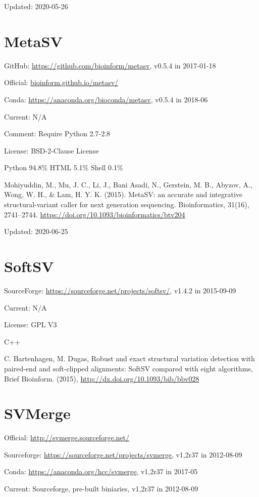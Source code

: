 \documentclass[]{article}
\begin{document}
Updated: 2020-05-26

\section{MetaSV}

GitHub: \url{https://github.com/bioinform/metasv}, v0.5.4 in 2017-01-18

Official: \url{bioinform.github.io/metasv/}

Conda: \url{https://anaconda.org/bioconda/metasv}, v0.5.4 in 2018-06

Current: N/A

Comment: Require Python 2.7-2.8

License: BSD-2-Clause License

Python 94.8\% HTML 5.1\% Shell 0.1\%

Mohiyuddin, M., Mu, J. C., Li, J., Bani Asadi, N., Gerstein, M. B., Abyzov, A., Wong, W. H., \& Lam, H. Y. K. (2015). MetaSV: an accurate and integrative structural-variant caller for next generation sequencing. Bioinformatics, 31(16), 2741–2744. \url{https://doi.org/10.1093/bioinformatics/btv204}

Updated: 2020-06-25

\section{SoftSV}

SourceForge: \url{https://sourceforge.net/projects/softsv/}, v1.4.2 in 2015-09-09

Current: N/A

License: GPL V3

C++

C. Bartenhagen, M. Dugas, Robust and exact structural variation detection with paired-end and soft-clipped alignments: SoftSV compared with eight algorithms, Brief Bioinform. (2015), \url{http://dx.doi.org/10.1093/bib/bbv028}

\section{SVMerge}

Official: \url{http://svmerge.sourceforge.net/}

Sourceforge: \url{https://sourceforge.net/projects/svmerge}, v1,2r37 in 2012-08-09

Conda: \url{https://anaconda.org/hcc/svmerge}, v1,2r37 in 2017-05

Current: Sourceforge, pre-built biniaries, v1,2r37 in 2012-08-09
\end{document}
